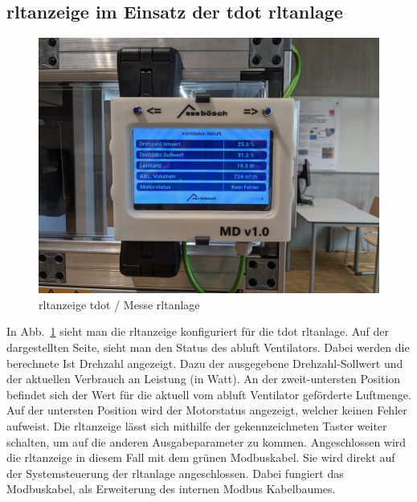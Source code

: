 \subsection{\ac{rltanzeige} im Einsatz der \gls{tdot} \ac{rltanlage}}\label{rltanzeige_tdot_kapitel}
\begin{figure}[H]
	\centering
	\includegraphics[width=0.7\linewidth]{Bilder/tdot_anzeige}
	\caption{\ac{rltanzeige} \gls{tdot} / Messe \ac{rltanlage}} 
	\label{fig:tdot_anzeige}
\end{figure}

In Abb.~\ref{fig:tdot_anzeige} sieht man die \ac{rltanzeige} konfiguriert für die \gls{tdot} \ac{rltanlage}. Auf der dargestellten Seite, sieht man den Status des \gls{abluft} Ventilators. Dabei werden die berechnete Ist Drehzahl angezeigt. Dazu der ausgegebene Drehzahl-Sollwert und der aktuellen Verbrauch an Leistung (in Watt). An der zweit-untersten Position befindet sich der Wert für die aktuell vom \gls{abluft} Ventilator geförderte Luftmenge. Auf der untersten Position wird der Motorstatus angezeigt, welcher keinen Fehler aufweist. Die \ac{rltanzeige} lässt sich mithilfe der gekennzeichneten Taster weiter schalten, um auf die anderen Ausgabeparameter zu kommen. Angeschlossen wird die \ac{rltanzeige} in diesem Fall mit dem grünen Modbuskabel. Sie wird direkt auf der Systemsteuerung der \ac{rltanlage} angeschlossen. Dabei fungiert das Modbuskabel, als Erweiterung des internen Modbus Kabelbaumes.

